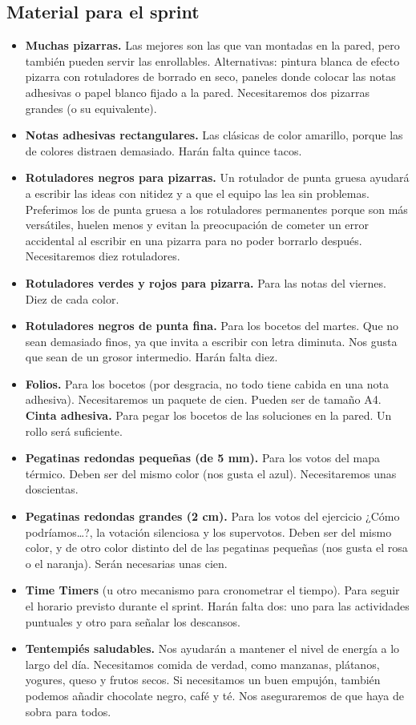 \documentclass[10pt]{article}
\begin{document}
\begin{multicols}{2}
\subsection*{Material para el sprint}
\begin{itemize}
\item \textbf{Muchas pizarras.} Las mejores son las que van montadas en la pared, pero también pueden servir las enrollables. Alternativas: pintura blanca de efecto pizarra con rotuladores de borrado en seco, paneles donde colocar las notas adhesivas o papel blanco fijado a la pared. Necesitaremos dos pizarras grandes (o su equivalente).
\item \textbf{Notas adhesivas rectangulares.} Las clásicas de color amarillo, porque las de colores distraen demasiado. Harán falta quince tacos.
\item \textbf{Rotuladores negros para pizarras.} Un rotulador de punta gruesa ayudará a escribir las ideas con nitidez y a que el equipo las lea sin problemas. Preferimos los de punta gruesa a los rotuladores permanentes porque son más versátiles, huelen menos y evitan la preocupación de cometer un error accidental al escribir en una pizarra para no poder borrarlo después. Necesitaremos diez rotuladores.
\item \textbf{Rotuladores verdes y rojos para pizarra.} Para las notas del viernes. Diez de cada color. 
\item \textbf{Rotuladores negros de punta fina.} Para los bocetos del martes. Que no sean demasiado finos, ya que invita a escribir con letra diminuta. Nos gusta que sean de un grosor intermedio. Harán falta diez.
\item \textbf{Folios.} Para los bocetos (por desgracia, no todo tiene cabida en una nota adhesiva). Necesitaremos un paquete de cien. Pueden ser de tamaño A4.
\textbf{Cinta adhesiva.} Para pegar los bocetos de las soluciones en la pared. Un rollo será suficiente. 
\item \textbf{Pegatinas redondas pequeñas (de 5 mm).} Para los votos del mapa térmico. Deben ser del mismo color (nos gusta el azul). Necesitaremos unas doscientas.
\item \textbf{Pegatinas redondas grandes (2 cm).} Para los votos del ejercicio ¿Cómo podríamos…?, la votación silenciosa y los supervotos. Deben ser del mismo color, y de otro color distinto del de las pegatinas pequeñas (nos gusta el rosa o el naranja). Serán necesarias unas cien.
\item \textbf{Time Timers} (u otro mecanismo para cronometrar el tiempo). Para seguir el horario previsto durante el sprint. Harán falta dos: uno para las actividades puntuales y otro para señalar los descansos.
\item \textbf{Tentempiés saludables.} Nos ayudarán a mantener el nivel de energía a lo largo del día. Necesitamos comida de verdad, como manzanas, plátanos, yogures, queso y frutos secos. Si necesitamos un buen empujón, también podemos añadir chocolate negro, café y té. Nos aseguraremos de que haya de sobra para todos.
\end{itemize}
\end{multicols}
\vspace{2cm}
\end{document}
